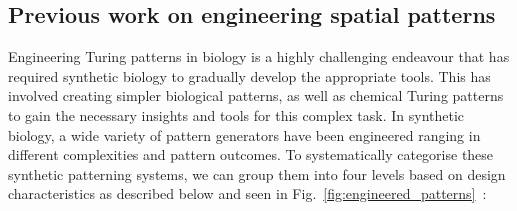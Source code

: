 \subsection{Previous work on engineering spatial patterns}

Engineering Turing patterns in biology is a highly challenging endeavour that has required synthetic biology to gradually develop the appropriate tools.
This has involved creating simpler biological patterns, as well as chemical Turing patterns to gain the necessary insights and tools for this complex task.
In synthetic biology, a wide variety of pattern generators have been engineered ranging in different complexities and pattern outcomes.
To systematically categorise these synthetic patterning systems, we can group them into four levels based on design characteristics as described below and seen in Fig.~\ref{fig:engineered_patterns}~\parencite{huidobro}:


